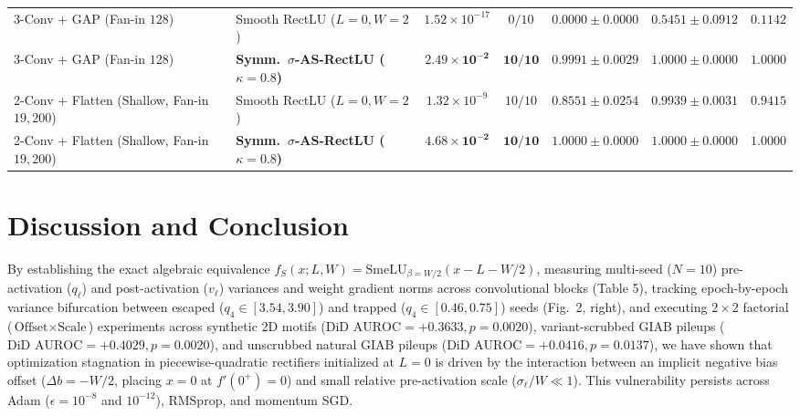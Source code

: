 \documentclass[11pt, a4paper]{article}
\begin{document}
\begin{table}[htbp]
{\begin{tabular}{llccccc}
3-Conv + GAP (Fan-in $128$) & Smooth RectLU ($L=0, W=2$) & $1.52\times 10^{-17}$ & $0/10$ & $0.0000 \pm 0.0000$ & $0.5451 \pm 0.0912$ & $0.1142$ \\
3-Conv + GAP (Fan-in $128$) & \textbf{Symm.\ $\sigma$-AS-RectLU ($\kappa=0.8$)} & $\mathbf{2.49\times 10^{-2}}$ & $\mathbf{10/10}$ & $\mathbf{0.9991 \pm 0.0029}$ & $\mathbf{1.0000 \pm 0.0000}$ & $\mathbf{1.0000}$ \\
2-Conv + Flatten (Shallow, Fan-in $19{,}200$) & Smooth RectLU ($L=0, W=2$) & $1.32\times 10^{-9}$ & $10/10$ & $0.8551 \pm 0.0254$ & $0.9939 \pm 0.0031$ & $0.9415$ \\
2-Conv + Flatten (Shallow, Fan-in $19{,}200$) & \textbf{Symm.\ $\sigma$-AS-RectLU ($\kappa=0.8$)} & $\mathbf{4.68\times 10^{-2}}$ & $\mathbf{10/10}$ & $\mathbf{1.0000 \pm 0.0000}$ & $\mathbf{1.0000 \pm 0.0000}$ & $\mathbf{1.0000}$ \\
\hline
\end{tabular}%
}
\end{table}


\section{Discussion and Conclusion}
By establishing the exact algebraic equivalence $f_{S}(x; L, W) = \text{SmeLU}_{\beta=W/2}(x - L - W/2)$, measuring multi-seed ($N=10$) pre-activation ($q_{\ell}$) and post-activation ($v_{\ell}$) variances and weight gradient norms across convolutional blocks (Table 5), tracking epoch-by-epoch variance bifurcation between escaped ($q_{4} \in [3.54, 3.90]$) and trapped ($q_{4} \in [0.46, 0.75]$) seeds (Fig.\ 2, right), and executing $2 \times 2$ factorial ($\text{Offset} \times \text{Scale}$) experiments across synthetic 2D motifs ($\text{DiD AUROC} = +0.3633, p = 0.0020$), variant-scrubbed GIAB pileups ($\text{DiD AUROC} = +0.4029, p = 0.0020$), and unscrubbed natural GIAB pileups ($\text{DiD AUROC} = +0.0416, p = 0.0137$), we have shown that optimization stagnation in piecewise-quadratic rectifiers initialized at $L = 0$ is driven by the interaction between an implicit negative bias offset ($\Delta b = -W/2$, placing $x=0$ at $f'(0^{+})=0$) and small relative pre-activation scale ($\sigma_{\ell}/W \ll 1$). This vulnerability persists across Adam ($\epsilon = 10^{-8}$ and $10^{-12}$), RMSprop, and momentum SGD.
\end{document}
